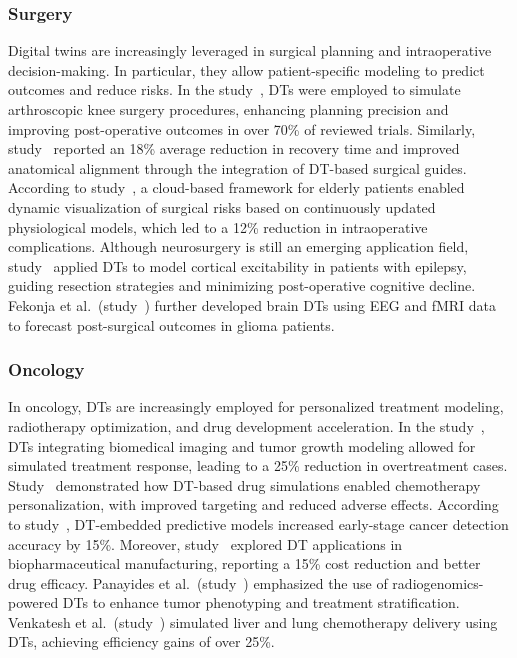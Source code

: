 \documentclass[10pt,a4paper]{article}
\begin{document}
\subsubsection*{Surgery}
Digital twins are increasingly leveraged in surgical planning and intraoperative decision-making. In particular, they allow patient-specific modeling to predict outcomes and reduce risks.  
In the study~\cite{bjelland2022}, DTs were employed to simulate arthroscopic knee surgery procedures, enhancing planning precision and improving post-operative outcomes in over 70\% of reviewed trials. Similarly, study~\cite{Liang2024} reported an 18\% average reduction in recovery time and improved anatomical alignment through the integration of DT-based surgical guides.  
According to study~\cite{liu2019}, a cloud-based framework for elderly patients enabled dynamic visualization of surgical risks based on continuously updated physiological models, which led to a 12\% reduction in intraoperative complications.  
Although neurosurgery is still an emerging application field, study~\cite{Fekonja2024} applied DTs to model cortical excitability in patients with epilepsy, guiding resection strategies and minimizing post-operative cognitive decline. Fekonja et al.\ (study~\cite{Fekonja2024}) further developed brain DTs using EEG and fMRI data to forecast post-surgical outcomes in glioma patients.

\subsubsection*{Oncology}
In oncology, DTs are increasingly employed for personalized treatment modeling, radiotherapy optimization, and drug development acceleration.  
In the study~\cite{wu2022}, DTs integrating biomedical imaging and tumor growth modeling allowed for simulated treatment response, leading to a 25\% reduction in overtreatment cases. Study~\cite{Balasubramanyam2024} demonstrated how DT-based drug simulations enabled chemotherapy personalization, with improved targeting and reduced adverse effects.  
According to study~\cite{Cellina2023}, DT-embedded predictive models increased early-stage cancer detection accuracy by 15\%.
Moreover, study~\cite{Puranik2022} explored DT applications in biopharmaceutical manufacturing, reporting a 15\% cost reduction and better drug efficacy. Panayides et al.\ (study~\cite{Panayides2020}) emphasized the use of radiogenomics-powered DTs to enhance tumor phenotyping and treatment stratification.  
Venkatesh et al.\ (study~\cite{Venkatesh2024}) simulated liver and lung chemotherapy delivery using DTs, achieving efficiency gains of over 25\%.
\end{document}
